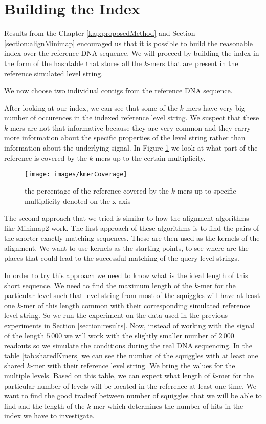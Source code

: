 \section{Building the Index}

Results from the Chapter \ref{kap:proposedMethod} and Section \ref{section:alignMinimap}
encouraged us that it is possible to build the reasonable index over the reference
DNA sequence. We will proceed by building the index in the form of the hashtable
that stores all the $k$-mers that are present in the reference simulated level string.

We now choose two individual contigs from the reference DNA sequence.

After looking at our index, we can see that some of the $k$-mers have very big
number of occurences in the indexed reference level string. We suspect that these
$k$-mers are not that informative because they are very common and they carry more
information about the specific properties of the level string rather than information
about the underlying signal. In Figure \ref{obr:kmerCoverage} we look at what part of the
reference is covered by the $k$-mers up to the certain multiplicity.

\begin{figure}
\centerline{\texttt{[image: images/kmerCoverage]}}
\caption[TODO]{the percentage of the reference covered by the $k$-mers up to specific multiplicity
denoted on the x-axis}
\label{obr:kmerCoverage}
\end{figure}


The second approach that we tried is similar to how the alignment algorithms like
Minimap2 work. The first approach of these algorithms is to find the pairs of the shorter
exactly matching sequences. These are then used as the kernels of the alignment. We want
to use kernels as the starting points, to see where are the places that could lead to the
successful matching of the query level strings.

In order to try this approach we need to know what is the ideal length of this short
sequence. We need to find the maximum length of the $k$-mer for the particular level
such that level string from most of the squiggles will have at least one $k$-mer
of this length common with their corresponding simulated reference level string.
So we run the experiment on the data used in the previous experiments in Section
\ref{section:results}. Now, instead of working with the signal of the length
$5\,000$ we will work with the slightly smaller number of $2\,000$ readouts so we
simulate the conditions during the real DNA sequencing. In the table \ref{tab:sharedKmers}
we can see the number of the squiggles with at least one shared $k$-mer with their reference
level string. We bring the values for the multiple levels. Based on this table,
we can expect what length of $k$-mer for the particular number of levels will be located
in the reference at least one time. We want to find the good tradeof between number of
squiggles that we will be able to find and the length of the $k$-mer which determines
the number of hits in the index we have to investigate.

